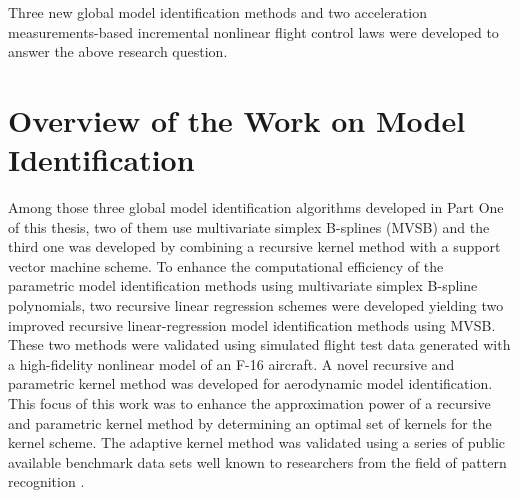 \vspace{-0.5cm}
\begin{shaded}
\end{shaded}
\vspace{-0.8cm}
\begin{shaded}
\end{shaded}
\vspace{-0.2cm}


Three new global model identification methods and two acceleration measurements-based incremental nonlinear flight control laws were developed to answer the above research question.

\section{Overview of the Work on Model Identification}
\label{sec:01concl}

Among those three global model identification algorithms developed in Part One of this thesis, two of them use multivariate simplex B-splines (\ac{MVSB}) and the third one was developed by combining a recursive kernel method with a support vector machine scheme.
To enhance the computational efficiency of the parametric model identification methods using multivariate simplex B-spline polynomials, two recursive linear regression schemes were developed yielding two improved recursive linear-regression model identification methods using \ac{MVSB}. These two methods were validated using simulated flight test data generated with a high-fidelity nonlinear model of an F-16 aircraft.
A novel recursive and parametric kernel method was developed for aerodynamic model identification. This focus of this work was to enhance the approximation power of a recursive and parametric kernel method by determining an optimal set of kernels for the kernel scheme. The adaptive kernel method was validated using a series of public available benchmark data sets well known to researchers from the field of pattern recognition \cite{ypzhao12,ypzhao09}.


